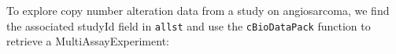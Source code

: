 \documentclass[graybox]{svmult}
\begin{document}

To explore copy number alteration data from a study on angiosarcoma,
we find the associated studyId field in \texttt{allst} and use the \texttt{cBioDataPack} function
to retrieve a MultiAssayExperiment:
\end{document}
